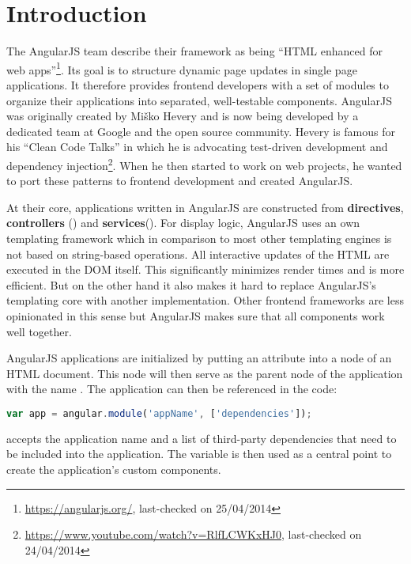 \section{Introduction}

The AngularJS team describe their framework as being ``HTML enhanced for web apps''\footnote{\url{https://angularjs.org/}, last-checked on 25/04/2014}. Its goal is to structure dynamic page updates in single page applications. It therefore provides frontend developers with a set of modules to organize their applications into separated, well-testable components. AngularJS was originally created by Mi\v{s}ko Hevery and is now being developed by a dedicated team at Google and the open source community. Hevery is famous for his ``Clean Code Talks'' in which he is advocating test-driven development and dependency injection\footnote{\url{https://www.youtube.com/watch?v=RlfLCWKxHJ0}, last-checked on 24/04/2014}. When he then started to work on web projects, he wanted to port these patterns to frontend development and created AngularJS.

At their core, applications written in AngularJS are constructed from \textbf{directives}, \textbf{controllers} () and \textbf{services}(). For display logic, AngularJS uses an own templating framework which in comparison to most other templating engines is not based on string-based operations. All interactive updates of the HTML are executed in the DOM itself. This significantly minimizes render times and is more efficient. But on the other hand it also makes it hard to replace AngularJS's templating core with another implementation. Other frontend frameworks are less opinionated in this sense but AngularJS makes sure that all components work well together.

AngularJS applications are initialized by putting an  attribute into a node of an HTML document. This node will then serve as the parent node of the application with the name . The application can then be referenced in the code:

\begin{lstlisting}[language=JavaScript, caption=Initializing an AngularJS app, label=lst:angular-initialize]
  var app = angular.module('appName', ['dependencies']);
\end{lstlisting}

 accepts the application name and a list of third-party dependencies that need to be included into the application. The variable  is then used as a central point to create the application's custom components.